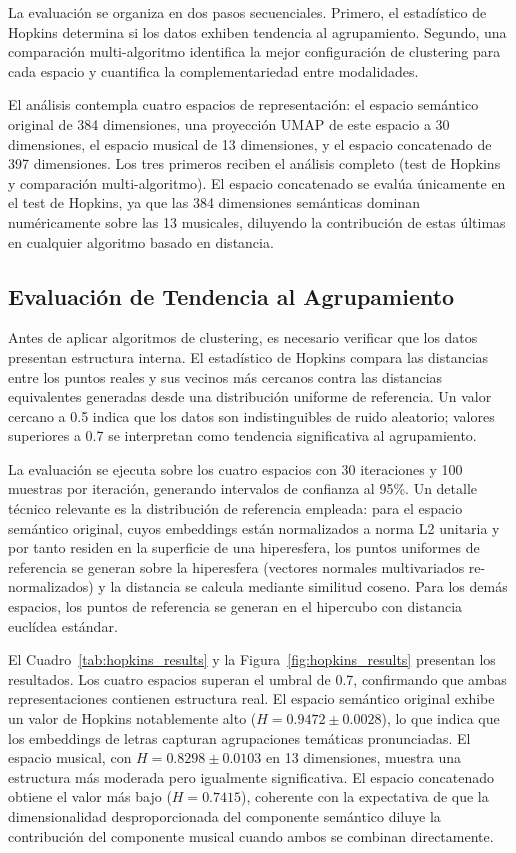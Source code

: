 La evaluación se organiza en dos pasos secuenciales. Primero, el estadístico de Hopkins determina si los datos exhiben tendencia al agrupamiento. Segundo, una comparación multi-algoritmo identifica la mejor configuración de clustering para cada espacio y cuantifica la complementariedad entre modalidades.

El análisis contempla cuatro espacios de representación: el espacio semántico original de 384 dimensiones, una proyección UMAP de este espacio a 30 dimensiones, el espacio musical de 13 dimensiones, y el espacio concatenado de 397 dimensiones. Los tres primeros reciben el análisis completo (test de Hopkins y comparación multi-algoritmo). El espacio concatenado se evalúa únicamente en el test de Hopkins, ya que las 384 dimensiones semánticas dominan numéricamente sobre las 13 musicales, diluyendo la contribución de estas últimas en cualquier algoritmo basado en distancia.

\subsection{Evaluación de Tendencia al Agrupamiento}
\label{subsec:evaluacion-hopkins}

Antes de aplicar algoritmos de clustering, es necesario verificar que los datos presentan estructura interna. El estadístico de Hopkins compara las distancias entre los puntos reales y sus vecinos más cercanos contra las distancias equivalentes generadas desde una distribución uniforme de referencia. Un valor cercano a 0.5 indica que los datos son indistinguibles de ruido aleatorio; valores superiores a 0.7 se interpretan como tendencia significativa al agrupamiento.

La evaluación se ejecuta sobre los cuatro espacios con 30 iteraciones y 100 muestras por iteración, generando intervalos de confianza al 95\%. Un detalle técnico relevante es la distribución de referencia empleada: para el espacio semántico original, cuyos embeddings están normalizados a norma L2 unitaria y por tanto residen en la superficie de una hiperesfera, los puntos uniformes de referencia se generan sobre la hiperesfera (vectores normales multivariados re-normalizados) y la distancia se calcula mediante similitud coseno. Para los demás espacios, los puntos de referencia se generan en el hipercubo con distancia euclídea estándar.



El Cuadro~\ref{tab:hopkins_results} y la Figura~\ref{fig:hopkins_results} presentan los resultados. Los cuatro espacios superan el umbral de 0.7, confirmando que ambas representaciones contienen estructura real. El espacio semántico original exhibe un valor de Hopkins notablemente alto ($H = 0.9472 \pm 0.0028$), lo que indica que los embeddings de letras capturan agrupaciones temáticas pronunciadas. El espacio musical, con $H = 0.8298 \pm 0.0103$ en 13 dimensiones, muestra una estructura más moderada pero igualmente significativa. El espacio concatenado obtiene el valor más bajo ($H = 0.7415$), coherente con la expectativa de que la dimensionalidad desproporcionada del componente semántico diluye la contribución del componente musical cuando ambos se combinan directamente.

